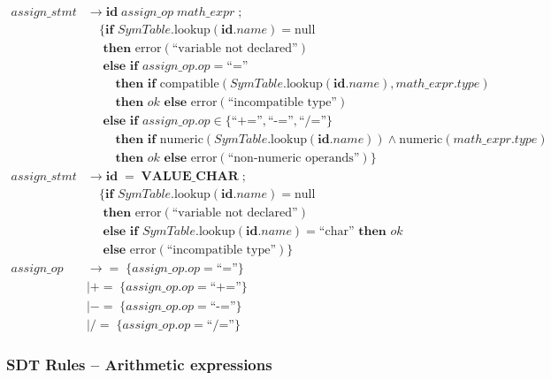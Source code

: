 \documentclass[letterpaper,12pt,oneside]{article}
\begin{document}
\begin{align*}
assign\_stmt &\rightarrow \mathbf{id} \; assign\_op \; math\_expr \; \mathbf{;} \\
            &\quad \{\textbf{if } SymTable.\text{lookup}(\mathbf{id}.name) = \text{null} \\
            &\quad \textbf{ then } \text{error}(\text{``variable not declared''}) \\
            &\quad \textbf{ else if } assign\_op.op = \text{``=''} \\
            &\quad\quad \textbf{ then if } \text{compatible}(SymTable.\text{lookup}(\mathbf{id}.name), math\_expr.type) \\
            &\quad\quad \textbf{ then } ok \textbf{ else } \text{error}(\text{``incompatible type''}) \\
            &\quad \textbf{ else if } assign\_op.op \in \{\text{``+=''}, \text{``-=''}, \text{``/=''}\} \\
            &\quad\quad \textbf{ then if } \text{numeric}(SymTable.\text{lookup}(\mathbf{id}.name)) \land \text{numeric}(math\_expr.type) \\
            &\quad\quad \textbf{ then } ok \textbf{ else } \text{error}(\text{``non-numeric operands''})\} \\[10pt]
assign\_stmt &\rightarrow \mathbf{id} \; \mathbf{=} \; \mathbf{VALUE\_CHAR} \; \mathbf{;} \\
            &\quad \{\textbf{if } SymTable.\text{lookup}(\mathbf{id}.name) = \text{null} \\
            &\quad \textbf{ then } \text{error}(\text{``variable not declared''}) \\
            &\quad \textbf{ else if } SymTable.\text{lookup}(\mathbf{id}.name) = \text{``char''} \textbf{ then } ok \\
            &\quad \textbf{ else } \text{error}(\text{``incompatible type''})\} \\[10pt]
assign\_op &\rightarrow \mathbf{=} \;\{assign\_op.op = \text{``=''}\} \\
           &\mid \mathbf{+=} \;\{assign\_op.op = \text{``+=''}\} \\
           &\mid \mathbf{-=} \;\{assign\_op.op = \text{``-=''}\} \\
           &\mid \mathbf{/=} \;\{assign\_op.op = \text{``/=''}\}
\end{align*}

\subsubsection{SDT Rules -- Arithmetic expressions}
\end{document}
